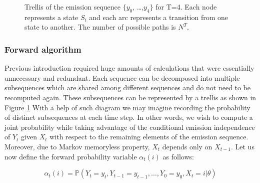 \begin{figure}[htbp]
\begin{center}
    \end{center}
    \caption{Trellis of the emission sequence $\{y_0$, \ldots,$y_4\}$ for T=4. Each node represents a state $S_i$ and each arc represents a transition from one state to another. The number of possible paths is $N^T$. }
    \label{fig:trellis}
    \end{figure}

\subsubsection{Forward algorithm}

Previous introduction required huge amounts of calculations that were essentially unnecessary and redundant. 
Each sequence can be decomposed into multiple subsequences which are shared among different sequences and do not need to be recomputed again. 
These subsequences can be represented by a trellis as shown in Figure \ref{fig:trellis} With a help of such diagram we may imagine recording the probability of 
distinct subsequences at each time step. In other words, we wish to compute a joint probability while taking advantage 
of the conditional emission independence of $Y_t$ given $X_t$ with respect to the remaining elements of the emission sequence. 
Moreover, due to Markov memoryless property, $X_t$ depends only on $X_{t-1}$. Let us now define the forward probability variable $\alpha_t(i)$ as follows:

\begin{equation}
    \alpha_t(i) = \mathbb{P}(Y_t = y_t, Y_{t-1} = y_{t-1},\ldots, Y_0 = y_0 , X_t = i| \theta)
\end{equation}

